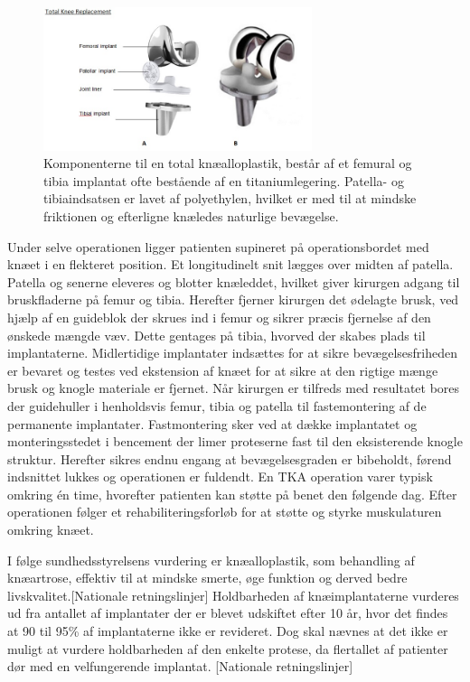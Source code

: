 \begin{figure}[H] 
\begin{center}
\includegraphics[width=0.7\textwidth]{figures/tka_implant}
\end{center}
\caption{Komponenterne til en total knæalloplastik, består af et femural og tibia implantat ofte bestående af en titaniumlegering. Patella- og tibiaindsatsen er lavet af polyethylen, hvilket er med til at mindske friktionen og efterligne knæledes naturlige bevægelse.\cite{1}} 
\label{fig:tka_implant} 
\end{figure}

Under selve operationen ligger patienten supineret på operationsbordet med knæet i en flekteret position. Et longitudinelt snit lægges over midten af patella. Patella og senerne eleveres og blotter knæleddet, hvilket giver kirurgen adgang til bruskfladerne på femur og tibia. Herefter fjerner kirurgen det ødelagte brusk, ved hjælp af en guideblok der skrues ind i femur og sikrer præcis fjernelse af den ønskede mængde væv. Dette gentages på tibia, hvorved der skabes plads til implantaterne. Midlertidige implantater indsættes for at sikre bevægelsesfriheden er bevaret og testes ved ekstension af knæet for at sikre at den rigtige mænge brusk og knogle materiale er fjernet. Når kirurgen er tilfreds med resultatet bores der guidehuller i henholdsvis femur, tibia og patella til fastemontering af de permanente implantater. Fastmontering sker ved at dække implantatet og monteringsstedet i bencement der limer proteserne fast til den eksisterende knogle struktur. Herefter sikres endnu engang at bevægelsesgraden er bibeholdt, førend indsnittet lukkes og operationen er fuldendt. En TKA operation varer typisk omkring én time, hvorefter patienten kan støtte på benet den følgende dag. Efter operationen følger et rehabiliteringsforløb for at støtte og styrke muskulaturen omkring knæet.\citep{Sanna2013} \citep{tka-technique}

I følge sundhedsstyrelsens vurdering er knæalloplastik, som behandling af knæartrose, effektiv til at mindske smerte, øge funktion og derved bedre livskvalitet.[Nationale retningslinjer] Holdbarheden af knæimplantaterne vurderes ud fra antallet af implantater der er blevet udskiftet efter 10 år, hvor det findes at 90 til 95\% af implantaterne ikke er revideret. Dog skal nævnes at det ikke er muligt at vurdere holdbarheden af den enkelte protese, da flertallet af patienter dør med en velfungerende implantat. [Nationale retningslinjer]

